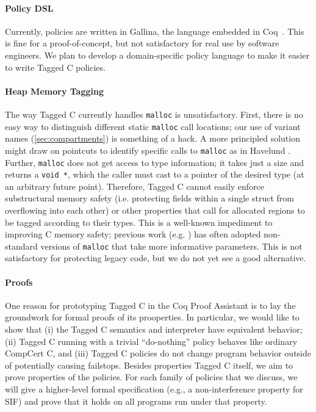 \documentclass{llncs}
\begin{document}
\paragraph*{Policy DSL}
Currently, policies are written in Gallina, the language embedded in Coq~\cite{coq}. This is fine for a
proof-of-concept, but not satisfactory for real use by software engineers.
We plan to develop a domain-specific policy language to make it easier to write Tagged C policies.

\paragraph*{Heap Memory Tagging}
The way Tagged C currently handles {\tt malloc} is unsatisfactory. First, there is no
easy way to distinguish different static {\tt malloc} call locations; our use of
variant names (\cref{sec:compartments}) is something of a hack.
A more principled solution might draw on pointcuts to identify specific calls to {\tt malloc}
as in Havelund \cite{Havelund08:RVC}.
  Further, {\tt malloc} does not get access to type information;
  it takes just a size and returns a {\tt void *}, which the caller must
  cast to a pointer of the desired type (at an arbitrary future point).
  Therefore, Tagged C cannot easily
  enforce substructural memory safety (i.e. protecting fields within a single struct
  from overflowing into each other) or other properties that call for allocated
  regions to be tagged according to their types.
  This is a well-known impediment to improving C memory safety;
  previous work  (e.g. \cite{Michael23:MSWASM}) has often adopted non-standard
  versions of {\tt malloc} that take more informative parameters. This is
  not satisfactory for protecting legacy code, but we do not yet see a good alternative.


\paragraph*{Proofs}
One reason for prototyping Tagged C in the Coq Proof Assistant is to lay the groundwork
for formal proofs of its prooperties.  In particular, we would like to show that
(i) the Tagged C semantics and interpreter have equivalent behavior; (ii) Tagged C running
with a trivial ``do-nothing'' policy behaves like ordinary CompCert C, and (iii) Tagged C policies
do not change program behavior outside of potentially causing failstops.
%
Besides properties Tagged C itself, we aim to prove properties of the policies.
For each family of policies that we discuss, we will give a higher-level formal
specification (e.g., a non-interference property for SIF) and prove that it holds on all
programs run under that property.
\end{document}
